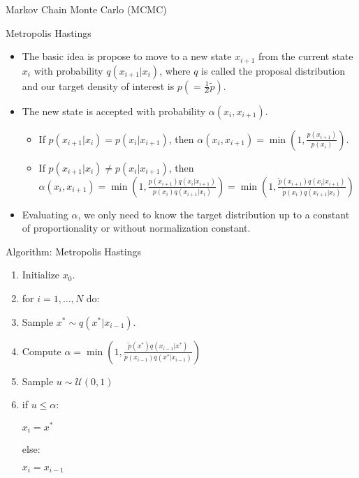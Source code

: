 \documentclass{beamer}
\begin{document}
\begin{section}{Markov Chain Monte Carlo (MCMC)}
    \begin{frame}{Metropolis Hastings}
        \begin{itemize}
            \item The basic idea is propose to move to a new state $x_{i+1}$ from the current state $x_i$ with probability $q(x_{i+1}|x_i)$, where $q$ is called the proposal distribution and our target density of interest is $p (= \frac{1}{Z} \tilde{p})$.
            \item The new state is accepted with probability $\alpha(x_i, x_{i+1})$.
            \begin{itemize}
                \item If $p(x_{i+1}| x_i) = p(x_i| x_{i+1})$, then $\alpha(x_i, x_{i+1}) = \min (1, \frac{p(x_{i+1})}{p(x_i)})$.
                \item If $p(x_{i+1}| x_i) \neq p(x_i| x_{i+1})$, then $\alpha(x_i, x_{i+1}) = \min (1, \frac{p(x_{i+1})q(x_i|x_{i+1})}{p(x_i)q(x_{i+1}|x_i)}) = \min (1, \frac{\tilde{p}(x_{i+1})q(x_i|x_{i+1})}{\tilde{p}(x_i)q(x_{i+1}|x_i)})$
            \end{itemize}
            \item Evaluating $\alpha$, we only need to know the target distribution up to a constant of proportionality or without normalization constant.
        \end{itemize}
    \end{frame}

    \begin{frame}{Algorithm: Metropolis Hastings}
        \begin{enumerate}
            \item Initialize $x_0$.
            \item for $i = 1, \ldots, N$ do:
            \item \quad Sample $x^* \sim q(x^*|x_{i-1})$.
            \item \quad Compute $\alpha = \min (1, \frac{\tilde{p}(x^*)q(x_{i-1}|x^*)}{\tilde{p}(x_{i-1})q(x^*|x_{i-1})})$
            \item \quad Sample $u \sim \mathcal{U}(0, 1)$
            \item \quad if $u \leq \alpha$:
            
            \quad \quad $x_i = x^*$
            
            \quad else:
            
            \quad \quad $x_i = x_{i-1}$
        \end{enumerate}
    \end{frame}


\end{section}
\end{document}
